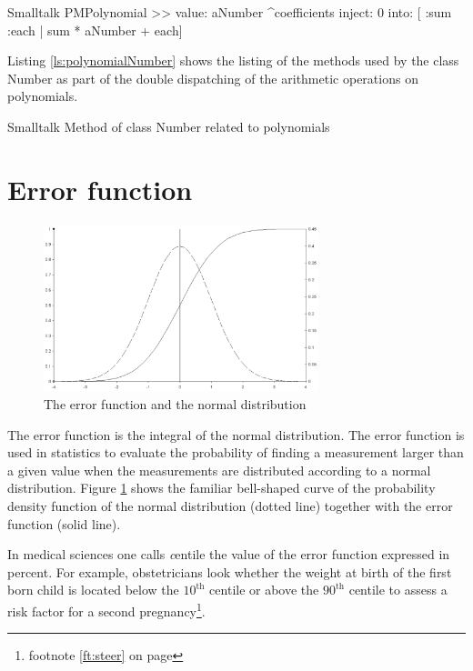 \begin{displaycode}{Smalltalk}
PMPolynomial >> value: aNumber
    ^coefficients inject: 0 into: [ :sum :each | sum * aNumber + each]
\end{displaycode}

Listing \ref{ls:polynomialNumber} shows the listing of the methods
used by the class Number as part of the double dispatching of the
arithmetic operations on polynomials.

\begin{listing}[label=lst:polynomialNumber]{Smalltalk}
{Method of class Number related to polynomials}

\end{listing}

\section{Error function}
\label{sec:errorFunction}
\begin{figure}
\centering\includegraphics[width=8cm]{Figures/ErrorFunction}
\caption{The error function and the normal distribution}
\label{fig:errorFunction}
\end{figure}
The error function is the integral of the normal distribution. The
error function is used in statistics to evaluate the probability
of finding a measurement larger than a given value when the
measurements are distributed according to a normal distribution.
Figure \ref{sec:errorFunction} shows the familiar bell-shaped
curve of the probability density function of the normal
distribution (dotted line) together with the error function (solid
line).

In medical sciences one calls {\textsl centile} the value of the error
function expressed in percent. For example, obstetricians look
whether the weight at birth of the first born child is located
below the $10^{\mbox{th}}$ centile or above the $90^{\mbox{th}}$
centile to assess a risk factor for a second
pregnancy\footnote{\cf footnote \ref{ft:steer} on page
\pageref{ft:steer}}.

